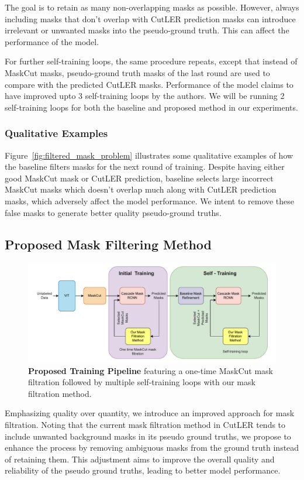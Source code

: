 The goal is to retain as many non-overlapping masks as possible. However, always including masks that don't overlap with CutLER prediction masks can introduce irrelevant or unwanted masks into the pseudo-ground truth. This can affect the performance of the model.

For further self-training loops, the same procedure repeats, except that instead of MaskCut masks, pseudo-ground truth masks of the last round are used to compare with the predicted CutLER masks. Performance of the model claims to have improved upto 3 self-training loops by the authors. We will be running 2 self-training loops for both the baseline and proposed method in our experiments.

\subsubsection{Qualitative Examples}
Figure~\ref{fig:filtered_mask_problem} illustrates some qualitative examples of how the baseline filters masks for the next round of training. Despite having either good MaskCut mask or CutLER prediction, baseline selects large incorrect MaskCut masks which doesn't overlap much along with CutLER prediction masks, which adversely affect the model performance. We intent to remove these false masks to generate better quality pseudo-ground truths.


\subsection{Proposed Mask Filtering Method}
\label{section:proposed_method}

\begin{figure}
	\centering
	\includegraphics[width=1\textwidth]{Images/main/proposed_method_last.pdf}
	\caption[\textbf{Proposed Training Pipeline}]{\textbf{Proposed Training Pipeline} featuring a one-time MaskCut mask filtration followed by multiple self-training loops with our mask filtration method.}
	\label{fig:proposed_training}
\end{figure}
Emphasizing quality over quantity, we introduce an improved approach for mask filtration. Noting that the current mask filtration method in CutLER tends to include unwanted background masks in its pseudo ground truths, we propose to enhance the process by removing ambiguous masks from the ground truth instead of retaining them. This adjustment aims to improve the overall quality and reliability of the pseudo ground truths, leading to better model performance.

